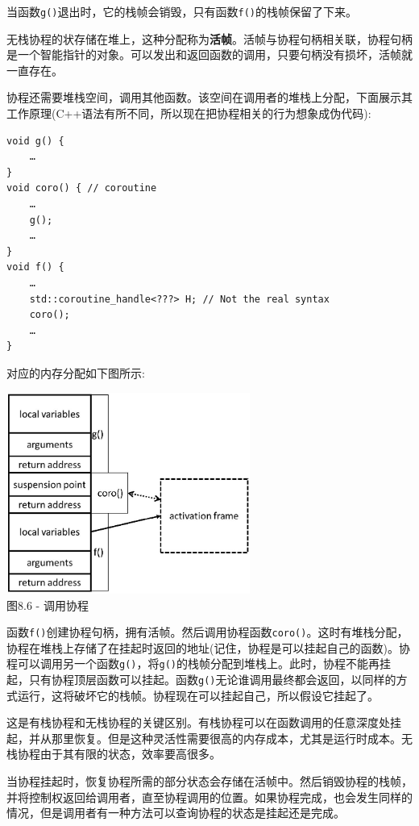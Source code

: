 当函数\texttt{g()}退出时，它的栈帧会销毁，只有函数\texttt{f()}的栈帧保留了下来。

无栈协程的状存储在堆上，这种分配称为\textbf{活帧}。活帧与协程句柄相关联，协程句柄是一个智能指针的对象。可以发出和返回函数的调用，只要句柄没有损坏，活帧就一直存在。

协程还需要堆栈空间，调用其他函数。该空间在调用者的堆栈上分配，下面展示其工作原理(C++语法有所不同，所以现在把协程相关的行为想象成伪代码):

\begin{lstlisting}[style=styleCXX]
void g() {
	…
}
void coro() { // coroutine
	…
	g();
	…
}
void f() {
	…
	std::coroutine_handle<???> H; // Not the real syntax
	coro();
	…
}
\end{lstlisting}

对应的内存分配如下图所示:

\begin{center}
\includegraphics[width=0.6\textwidth]{content/2/chapter8/images/6.jpg}\\
图8.6 - 调用协程
\end{center}

函数\texttt{f()}创建协程句柄，拥有活帧。然后调用协程函数\texttt{coro()}。这时有堆栈分配，协程在堆栈上存储了在挂起时返回的地址(记住，协程是可以挂起自己的函数)。协程可以调用另一个函数\texttt{g()}，将\texttt{g()}的栈帧分配到堆栈上。此时，协程不能再挂起，只有协程顶层函数可以挂起。函数\texttt{g()}无论谁调用最终都会返回，以同样的方式运行，这将破坏它的栈帧。协程现在可以挂起自己，所以假设它挂起了。 

这是有栈协程和无栈协程的关键区别。有栈协程可以在函数调用的任意深度处挂起，并从那里恢复。但是这种灵活性需要很高的内存成本，尤其是运行时成本。无栈协程由于其有限的状态，效率要高很多。

当协程挂起时，恢复协程所需的部分状态会存储在活帧中。然后销毁协程的栈帧，并将控制权返回给调用者，直至协程调用的位置。如果协程完成，也会发生同样的情况，但是调用者有一种方法可以查询协程的状态是挂起还是完成。

